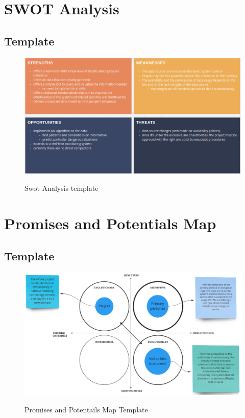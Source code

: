 \documentclass[../main.tex]{subfiles}
\begin{document}
    \chapter{SWOT Analysis}
    \section{Template}
    \begin{figure}[H]
        \centering
        \includegraphics[scale = 0.5]{assets/swot.png} \\
        \caption[]{Swot Analysis template}\label{fig:figure10}
    \end{figure}
    \chapter{Promises and Potentials Map}
    \section{Template}
    \begin{figure}[H]
        \centering
        \includegraphics[scale = 0.4]{assets/promises.png} \\
        \caption[]{Promises and Potentails Map Template}\label{fig:figure11}
    \end{figure}
\end{document}
